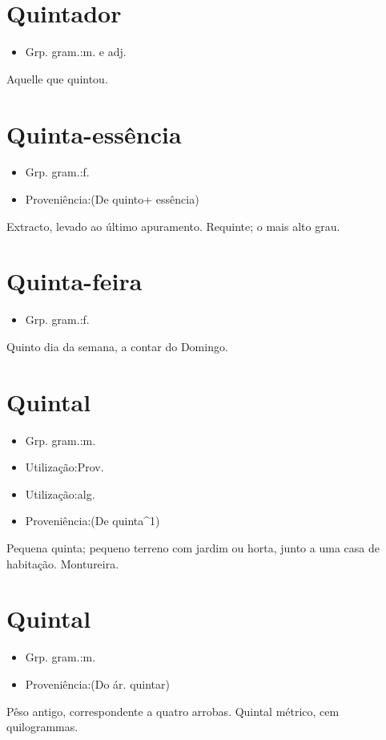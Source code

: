\section{Quintador}
\begin{itemize}
\item {Grp. gram.:m.  e  adj.}
\end{itemize}
Aquelle que quintou.
\section{Quinta-essência}
\begin{itemize}
\item {Grp. gram.:f.}
\end{itemize}
\begin{itemize}
\item {Proveniência:(De \textunderscore quinto\textunderscore  + \textunderscore essência\textunderscore )}
\end{itemize}
Extracto, levado ao último apuramento.
Requinte; o mais alto grau.
\section{Quinta-feira}
\begin{itemize}
\item {Grp. gram.:f.}
\end{itemize}
Quinto dia da semana, a contar do Domingo.
\section{Quintal}
\begin{itemize}
\item {Grp. gram.:m.}
\end{itemize}
\begin{itemize}
\item {Utilização:Prov.}
\end{itemize}
\begin{itemize}
\item {Utilização:alg.}
\end{itemize}
\begin{itemize}
\item {Proveniência:(De \textunderscore quinta\textunderscore ^1)}
\end{itemize}
Pequena quinta; pequeno terreno com jardim ou horta, junto a uma casa de habitação.
Montureira.
\section{Quintal}
\begin{itemize}
\item {Grp. gram.:m.}
\end{itemize}
\begin{itemize}
\item {Proveniência:(Do ár. \textunderscore quintar\textunderscore )}
\end{itemize}
Pêso antigo, correspondente a quatro arrobas.
\textunderscore Quintal métrico\textunderscore , cem quilogrammas.
